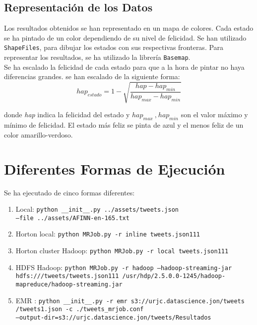 \documentclass[12pt,a4paper]{article}
\begin{document}
\subsection{Representación de los Datos}
Los resultados obtenidos se han representado en un mapa de colores. Cada estado se ha pintado de un color dependiendo de su nivel de felicidad. Se han utilizado \texttt{ShapeFiles}, para dibujar los estados con sus respectivas fronteras. Para representar los resultados, se ha utilizado la librería \texttt{Basemap}.\\

Se ha escalado la felicidad de cada estado para que a la hora de pintar no haya diferencias grandes. se han escalado de la siguiente forma:
$$hap_{estado}=1-\displaystyle \sqrt{\dfrac{hap-hap_{min}}{hap_{max}-hap_{min}}}$$

donde \textit{hap} indica la felicidad del estado y $hap_{max}\ \text{,}\ hap_{min}$ son el valor máximo y mínimo de felicidad.
El estado más feliz se pinta de azul y el menos feliz de un color amarillo-verdoso.


\section{Diferentes Formas de Ejecución}

Se ha ejecutado de cinco formas diferentes:
\begin{enumerate}
\item Local: \texttt{python \_\_init\_\_.py ../assets/tweets.json \\--file ../assets/AFINN-en-165.txt}
\item Horton local: \texttt{python MRJob.py -r inline tweets.json111}
\item Horton cluster Hadoop: \texttt{python MRJob.py -r local tweets.json111}
\item HDFS Hadoop: \texttt{python MRJob.py -r hadoop --hadoop-streaming-jar \\ hdfs:///tweets/tweets.json111  /usr/hdp/2.5.0.0-1245/hadoop-\\mapreduce/hadoop-streaming.jar}
\item EMR : \texttt{python \_\_init\_\_.py -r emr s3://urjc.datascience.jon/tweets\\/tweets1.json -c ./tweets\_mrjob.conf \\--output-dir=s3://urjc.datascience.jon/tweets/Resultados}
\end{enumerate}
\end{document}
